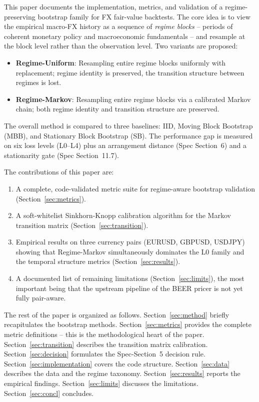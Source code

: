 \documentclass[11pt,a4paper]{article}
\theoremstyle{definition}
\begin{document}
This paper documents the implementation, metrics, and validation of a regime-preserving bootstrap family for FX fair-value backtests. The core idea is to view the empirical macro-FX history as a sequence of \emph{regime blocks} -- periods of coherent monetary policy and macroeconomic fundamentals -- and resample at the block level rather than the observation level. Two variants are proposed:

\begin{itemize}[leftmargin=2em]
  \item \textbf{Regime-Uniform}: Resampling entire regime blocks uniformly with replacement; regime identity is preserved, the transition structure between regimes is lost.
  \item \textbf{Regime-Markov}: Resampling entire regime blocks via a calibrated Markov chain; both regime identity and transition structure are preserved.
\end{itemize}

The overall method is compared to three baselines: IID, Moving Block Bootstrap (MBB), and Stationary Block Bootstrap (SB). The performance gap is measured on six loss levels (L0--L4) plus an arrangement distance (Spec Section~6) and a stationarity gate (Spec Section~11.7).

The contributions of this paper are:
\begin{enumerate}[leftmargin=2em]
  \item A complete, code-validated metric suite for regime-aware bootstrap validation (Section~\ref{sec:metrics}).
  \item A soft-whitelist Sinkhorn-Knopp calibration algorithm for the Markov transition matrix (Section~\ref{sec:transition}).
  \item Empirical results on three currency pairs (EURUSD, GBPUSD, USDJPY) showing that Regime-Markov simultaneously dominates the L0 family and the temporal structure metrics (Section~\ref{sec:results}).
  \item A documented list of remaining limitations (Section~\ref{sec:limits}), the most important being that the upstream pipeline of the BEER pricer is not yet fully pair-aware.
\end{enumerate}

The rest of the paper is organized as follows. Section~\ref{sec:method} briefly recapitulates the bootstrap methods. Section~\ref{sec:metrics} provides the complete metric definitions -- this is the methodological heart of the paper. Section~\ref{sec:transition} describes the transition matrix calibration. Section~\ref{sec:decision} formulates the Spec-Section~5 decision rule. Section~\ref{sec:implementation} covers the code structure. Section~\ref{sec:data} describes the data and the regime taxonomy. Section~\ref{sec:results} reports the empirical findings. Section~\ref{sec:limits} discusses the limitations. Section~\ref{sec:concl} concludes.
\end{document}
